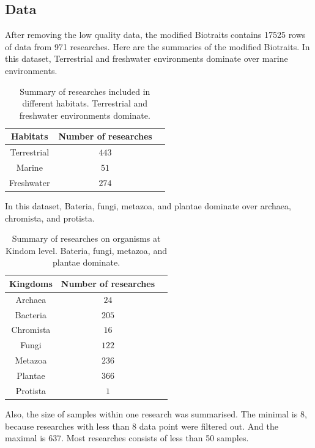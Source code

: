\documentclass[11pt]{article}
\begin{document}
	\subsection{Data}
	After removing the low quality data, the modified Biotraits contains 17525 rows of data from 971 researches. Here are the summaries of the modified Biotraits. In this dataset, Terrestrial and freshwater environments dominate over marine environments.
		\begin{table}[H] \centering 
		\caption{Summary of researches included in different habitats. Terrestrial and freshwater environments dominate.}
		
		\label{plttbl}
		\begin{tabular}{c|cc} 
			\hline 
			Habitats & Number of researches \\
			\hline
		Terrestrial & $443$\\
			Marine & $51$ \\ 
			Freshwater & $274$ \\ 

			\hline
		\end{tabular}
	\end{table}
	In this dataset, Bateria, fungi, metazoa, and plantae dominate over archaea, chromista, and protista.
		\begin{table}[H] \centering 
		\caption{Summary of researches on organisms at Kindom level. Bateria, fungi, metazoa, and plantae dominate.}
		\label{plttbl}
		\begin{tabular}{c|cc} 
			\hline 
			Kingdoms & Number of researches \\
			\hline
			Archaea & $24$\\
			Bacteria & $205$ \\ 
			Chromista & $16$ \\ 
			Fungi & $122$\\
			Metazoa & $236$\\
			Plantae & $366$\\
			Protista & $1$\\

			\hline
		\end{tabular}
	\end{table}
Also, the size of samples within one research was summarised. The minimal is 8, because researches with less than 8 data point 	were filtered out. And the maximal is 637. Most researches consists of less than 50 samples.
\end{document}

